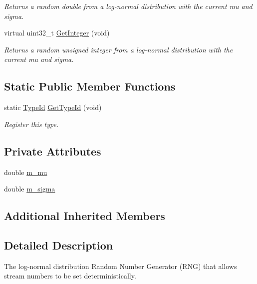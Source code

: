 \begin{DoxyCompactItemize}
\begin{DoxyCompactList}\small\item\em Returns a random double from a log-\/normal distribution with the current mu and sigma. \end{DoxyCompactList}\item 
virtual uint32\+\_\+t \hyperlink{classns3_1_1LogNormalRandomVariable_addd3b764b837aba256b3d1873c8b1ce6}{Get\+Integer} (void)
\begin{DoxyCompactList}\small\item\em Returns a random unsigned integer from a log-\/normal distribution with the current mu and sigma. \end{DoxyCompactList}\end{DoxyCompactItemize}
\subsection*{Static Public Member Functions}
\begin{DoxyCompactItemize}
\item 
static \hyperlink{classns3_1_1TypeId}{Type\+Id} \hyperlink{classns3_1_1LogNormalRandomVariable_af531456b8d8c3c162717a662199ba9ed}{Get\+Type\+Id} (void)
\begin{DoxyCompactList}\small\item\em Register this type. \end{DoxyCompactList}\end{DoxyCompactItemize}
\subsection*{Private Attributes}
\begin{DoxyCompactItemize}
\item 
double \hyperlink{classns3_1_1LogNormalRandomVariable_a562108c77ea1dbc4786fe96d037b0fc9}{m\+\_\+mu}
\item 
double \hyperlink{classns3_1_1LogNormalRandomVariable_a5836fe394673dd9f142e3a15904419a9}{m\+\_\+sigma}
\end{DoxyCompactItemize}
\subsection*{Additional Inherited Members}


\subsection{Detailed Description}
The log-\/normal distribution Random Number Generator (R\+NG) that allows stream numbers to be set deterministically. 

